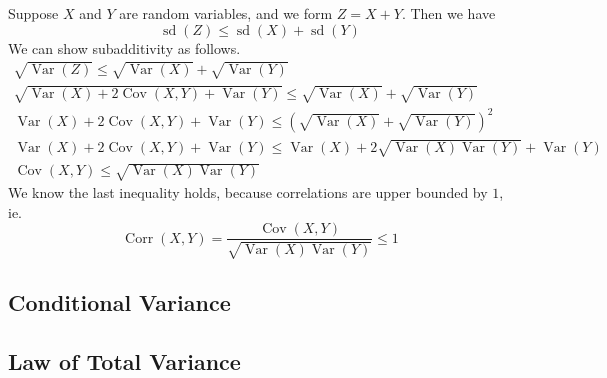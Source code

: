 \documentclass[11pt]{report} %
\begin{document}
Suppose $X$ and $Y$ are random variables, and we form $Z = X + Y$. Then we have
\begin{equation}
\operatorname{sd}\left(Z\right) \leq \operatorname{sd}\left(X\right) + \operatorname{sd}\left(Y\right)
\end{equation}
We can show subadditivity as follows. 
\begin{gather}
\sqrt{\operatorname{Var}\left(Z\right)} \leq \sqrt{\operatorname{Var}\left(X\right)} + \sqrt{\operatorname{Var}\left(Y\right)} \\
\sqrt{\operatorname{Var}\left(X\right) + 2\operatorname{Cov}\left(X, Y\right) +\operatorname{Var}\left(Y\right)} \leq \sqrt{\operatorname{Var}\left(X\right)} + \sqrt{\operatorname{Var}\left(Y\right)} \\
\operatorname{Var}\left(X\right) + 2\operatorname{Cov}\left(X, Y\right) +\operatorname{Var}\left(Y\right) \leq \left(\sqrt{\operatorname{Var}\left(X\right)} + \sqrt{\operatorname{Var}\left(Y\right)}\right)^{2} \\
\operatorname{Var}\left(X\right) + 2\operatorname{Cov}\left(X, Y\right) +\operatorname{Var}\left(Y\right) \leq \operatorname{Var}\left(X\right) + 2\sqrt{\operatorname{Var}\left(X\right)\operatorname{Var}\left(Y\right)}
+ \operatorname{Var}\left(Y\right) \\
\operatorname{Cov}\left(X, Y\right) \leq \sqrt{\operatorname{Var}\left(X\right)\operatorname{Var}\left(Y\right)}
\end{gather}
We know the last inequality holds, because correlations are upper bounded by $1$, ie.
\begin{equation}
\operatorname{Corr}\left(X, Y\right) = \dfrac{\operatorname{Cov}\left(X, Y\right)}{\sqrt{\operatorname{Var}\left(X\right)\operatorname{Var}\left(Y\right)}} \leq 1
\end{equation}

\subsection{Conditional Variance}

\subsection{Law of Total Variance}
\end{document}
